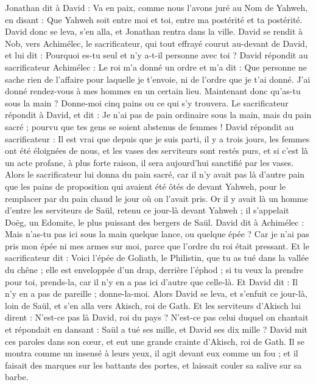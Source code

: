 \begin{multicols}{2}
Jonathan dit à David : Va en paix, comme nous l'avons juré au Nom de Yahweh, en disant : Que Yahweh soit entre moi et toi, entre ma postérité et ta postérité.
David donc se leva, s'en alla, et Jonathan rentra dans la ville.
\VerseOne{}David se rendit à Nob, vers Achimélec, le sacrificateur, qui tout effrayé courut au-devant de David, et lui dit : Pourquoi es-tu seul et n'y a-t-il personne avec toi ?
David répondit au sacrificateur Achimélec : Le roi m'a donné un ordre et m'a dit : Que personne ne sache rien de l'affaire pour laquelle je t'envoie, ni de l'ordre que je t'ai donné. J'ai donné rendez-vous à mes hommes en un certain lieu.
Maintenant donc qu'as-tu sous la main ? Donne-moi cinq pains ou ce qui s'y trouvera.
Le sacrificateur répondit à David, et dit : Je n'ai pas de pain ordinaire sous la main, mais du pain sacré ; pourvu que tes gens se soient abstenus de femmes !
David répondit au sacrificateur : Il est vrai que depuis que je suis parti, il y a trois jours, les femmes ont été éloignées de nous, et les vases des serviteurs sont restés purs, et si c'est là un acte profane, à plus forte raison, il sera aujourd'hui sanctifié par les vases.
Alors le sacrificateur lui donna du pain sacré, car il n'y avait pas là d'autre pain que les pains de proposition qui avaient été ôtés de devant Yahweh, pour le remplacer par du pain chaud le jour où on l'avait pris.
Or il y avait là un homme d'entre les serviteurs de Saül, retenu ce jour-là devant Yahweh ; il s'appelait Doëg, un Edomite, le plus puissant des bergers de Saül.
David dit à Achimélec : Mais n'as-tu pas ici sous la main quelque lance, ou quelque épée ? Car je n'ai pas pris mon épée ni mes armes sur moi, parce que l'ordre du roi était pressant.
Et le sacrificateur dit : Voici l'épée de Goliath, le Philistin, que tu as tué dans la vallée du chêne ; elle est enveloppée d'un drap, derrière l'éphod ; si tu veux la prendre pour toi, prends-la, car il n'y en a pas ici d'autre que celle-là. Et David dit : Il n'y en a pas de pareille ; donne-la-moi.
Alors David se leva, et s'enfuit ce jour-là, loin de Saül, et s'en alla vers Akisch, roi de Gath.
Et les serviteurs d'Akisch lui dirent : N'est-ce pas là David, roi du pays ? N'est-ce pas celui duquel on chantait et répondait en dansant : Saül a tué ses mille, et David ses dix mille ?
David mit ces paroles dans son cœur, et eut une grande crainte d'Akisch, roi de Gath.
Il se montra comme un insensé à leurs yeux, il agit devant eux comme un fou ; et il faisait des marques sur les battants des portes, et laissait couler sa salive sur sa barbe.

\end{multicols}
